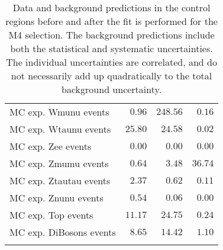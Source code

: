 \begin{table}
\begin{center}
{\begin{tabular*}{\textwidth}{@{\extracolsep{\fill}}lrrr}
        MC exp. Wmunu events         & $0.96$          & $248.56$          & $0.16$              \\
        MC exp. Wtaunu events         & $25.80$          & $24.58$          & $0.02$              \\
        MC exp. Zee events         & $0.00$          & $0.00$          & $0.00$              \\
        MC exp. Zmumu events         & $0.64$          & $3.48$          & $36.74$              \\
        MC exp. Ztautau events         & $2.37$          & $0.62$          & $0.11$              \\
        MC exp. Znunu events         & $0.54$          & $0.06$          & $0.00$              \\
        MC exp. Top events         & $11.17$          & $24.75$          & $0.24$              \\
        MC exp. DiBosons events         & $8.65$          & $14.42$          & $1.10$              \\
\noalign{\smallskip}\hline\noalign{\smallskip}
\end{tabular*}
}
\end{center}
\caption{Data and background predictions in the control regions before and after the fit is performed for the M4 selection.
  The background predictions include both the statistical and systematic uncertainties.
    The individual uncertainties are correlated, and do not necessarily add up
    quadratically to the total background uncertainty.
}
\label{tab:ControlRegion_M4}
\end{table}
%
